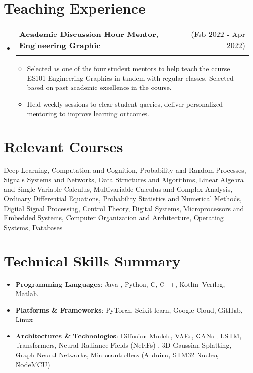 \documentclass[a4paper,10pt]{report}
\makeatletter
\newcommand{\resumeItem}[2]{
  \item\small{
    \textbf{#1}{: #2 \vspace{-2pt}}
  }
}
\newcommand{\resumeSubheading}[4]{
  \vspace{-1pt}\item
    \begin{tabular*}{0.97\textwidth}[t]{l@{\extracolsep{\fill}}r}
      \textbf{#1} & #2 \\
      \textit{\small#3} & \textit{\small #4} \\
    \end{tabular*}\vspace{-6pt}
}
\newcommand{\resumeSubItem}[2]{\resumeItem{#1}{#2}\vspace{-4pt}}
\newcommand{\resumeSubHeadingListStart}{\begin{itemize}[leftmargin=*]}
\newcommand{\resumeSubHeadingListEnd}{\end{itemize}}
\makeatother
\begin{document}
\section{Teaching Experience}

\resumeSubHeadingListStart
\resumeSubheading{Academic Discussion Hour Mentor, Engineering Graphic} {(Feb 2022 - Apr 2022)}
{}{}
\vspace{-12pt}
\begin{itemize}
\item Selected as one of the four student mentors to help teach the course ES101 Engineering Graphics in tandem with regular classes. Selected based on past academic excellence in the course.

\vspace{-3pt}
\item Held weekly sessions to clear student queries, deliver personalized mentoring to improve learning outcomes.
\end{itemize}


\resumeSubHeadingListEnd



\section{Relevant Courses}
\vspace{-2pt}
 \begin{itemize}[leftmargin = *,itemsep=-3pt]

    Deep Learning, Computation and Cognition, Probability and Random Processes, Signals Systems and Networks, Data Structures and Algorithms, Linear Algebra and Single Variable Calculus, Multivariable Calculus and Complex Analysis, Ordinary Differential Equations, Probability Statistics and Numerical Methods, Digital Signal Processing, Control Theory, Digital Systems, Microprocessors and Embedded Systems, Computer Organization and Architecture, Operating Systems, Databases
    

\end{itemize}


\section{Technical Skills Summary}
 \resumeSubHeadingListStart
 \resumeSubItem{Programming Languages}
 {	Java , Python, C, C++, Kotlin, Verilog, Matlab.}
 \resumeSubItem{Platforms \& Frameworks}{PyTorch, Scikit-learn, Google Cloud, GitHub, Linux}
  \resumeSubItem{Architectures \& Technologies}{Diffusion Models, VAEs, GANs , LSTM, Transformers, Neural Radiance Fields (NeRFs) , 3D Gaussian Splatting, Graph Neural Networks, Microcontrollers (Arduino, STM32 Nucleo, NodeMCU) }
 
 \resumeSubHeadingListEnd
\end{document}
